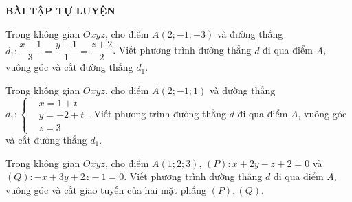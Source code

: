 \begin{center}
	\textbf{BÀI TẬP TỰ LUYỆN}
\end{center}
\setcounter{bt}{0}
\begin{bt}%
	Trong không gian $Oxyz$, cho điểm $A(2;-1;-3)$ và đường thẳng\newline $d_1:\dfrac{x-1}{3}=\dfrac{y-1}{1}=\dfrac{z+2}{2}$. Viết phương trình đường thẳng $d$ đi qua điểm $A$, vuông góc và cắt đường thẳng $d_1$.
\end{bt}
\begin{bt}%
	Trong không gian $Oxyz$, cho điểm $A(2;-1;1)$ và đường thẳng $d_1:\left\{\begin{aligned}
	&x=1+t\\&y=-2+t\\&z=3
	\end{aligned}\right.$.\newline
	Viết phương trình đường thẳng $d$ đi qua điểm $A$, vuông góc và cắt đường thẳng $d_1$.
\end{bt}
\begin{bt}%
	Trong không gian $Oxyz$, cho điểm $A(1;2;3)$, $(P):x+2y-z+2=0$ và\newline
	$(Q):-x+3y+2z-1=0$. Viết phương trình đường thẳng $d$ đi qua điểm $A$, vuông góc và cắt giao tuyến của hai mặt phẳng $(P),(Q)$.
\end{bt}
